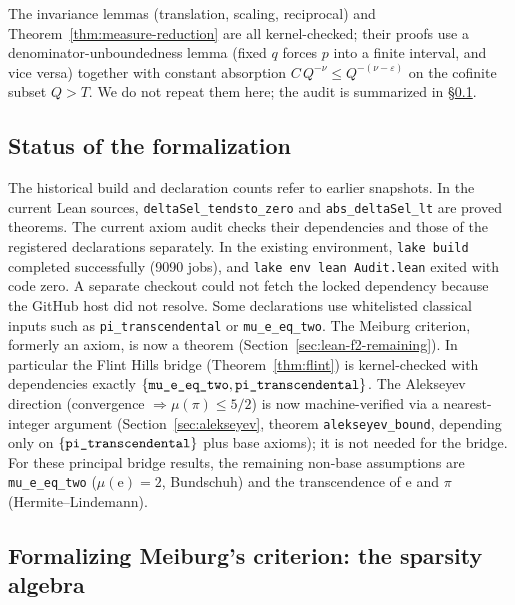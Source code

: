 \documentclass[11pt]{amsart}
\theoremstyle{definition}
\theoremstyle{remark}
\numberwithin{equation}{section}
\newcommand{\irr}{\mu}
\newcommand{\ee}{\mathrm{e}}
\begin{document}
The invariance lemmas (translation, scaling, reciprocal) and Theorem~\ref{thm:measure-reduction} are all kernel-checked; their proofs use a denominator-unboundedness lemma (fixed $q$ forces $p$ into a finite interval, and vice versa) together with constant absorption $C\,Q^{-\nu}\le Q^{-(\nu-\varepsilon)}$ on the cofinite subset $Q>T$. We do not repeat them here; the audit is summarized in \S\ref{sec:lean-status}.

\subsection{Status of the formalization}\label{sec:lean-status}

The historical build and declaration counts refer to earlier snapshots.
In the current Lean sources, \texttt{deltaSel\_tendsto\_zero} and
\texttt{abs\_deltaSel\_lt} are proved theorems. The current axiom audit
checks their dependencies and those of the registered declarations
separately. In the existing environment, \texttt{lake build} completed
successfully (9090 jobs), and \texttt{lake env lean Audit.lean} exited
with code zero. A separate checkout could not fetch the locked
dependency because the GitHub host did not resolve. Some declarations use whitelisted classical inputs such
as \texttt{pi\_transcendental} or \texttt{mu\_e\_eq\_two}.
The Meiburg criterion, formerly an axiom, is now a theorem (Section~\ref{sec:lean-f2-remaining}). In particular the Flint Hills bridge (Theorem~\ref{thm:flint}) is kernel-checked with dependencies exactly $\{\texttt{mu\_\allowbreak{}e\_\allowbreak{}eq\_\allowbreak{}two},\texttt{pi\_\allowbreak{}transcendental}\}$. The Alekseyev direction (convergence $\Rightarrow\irr(\pi)\le5/2$) is now machine-verified via a nearest-integer argument (Section~\ref{sec:alekseyev}, theorem \texttt{alekseyev\_\allowbreak{}bound}, depending only on $\{\texttt{pi\_\allowbreak{}transcendental}\}$ plus base axioms); it is not needed for the bridge. For these principal bridge results, the remaining non-base assumptions are \texttt{mu\_\allowbreak{}e\_\allowbreak{}eq\_\allowbreak{}two} ($\irr(\ee)=2$, Bundschuh) and the transcendence of $\ee$ and $\pi$ (Hermite--Lindemann).

\subsection{Formalizing Meiburg's criterion: the sparsity algebra}\label{sec:lean-f2}
\end{document}
